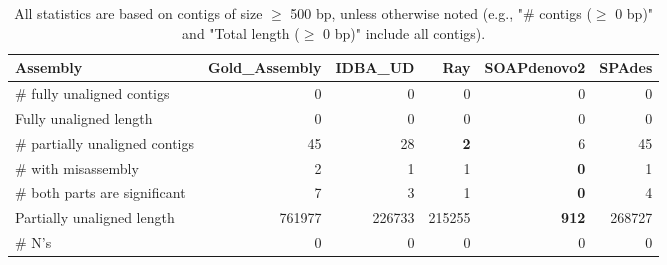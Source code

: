\documentclass[12pt,a4paper]{article}
\begin{document}
\begin{table}[ht]
\begin{center}
\caption{All statistics are based on contigs of size $\geq$ 500 bp, unless otherwise noted (e.g., "\# contigs ($\geq$ 0 bp)" and "Total length ($\geq$ 0 bp)" include all contigs).}
\begin{tabular}{|l*{5}{|r}|}
\hline
Assembly & Gold\_Assembly & IDBA\_UD & Ray & SOAPdenovo2 & SPAdes \\ \hline
\# fully unaligned contigs & 0 & 0 & 0 & 0 & 0 \\ \hline
Fully unaligned length & 0 & 0 & 0 & 0 & 0 \\ \hline
\# partially unaligned contigs & 45 & 28 & {\bf 2} & 6 & 45 \\ \hline
\hspace{5mm}\# with misassembly & 2 & 1 & 1 & {\bf 0} & 1 \\ \hline
\hspace{5mm}\# both parts are significant & 7 & 3 & 1 & {\bf 0} & 4 \\ \hline
Partially unaligned length & 761977 & 226733 & 215255 & {\bf 912} & 268727 \\ \hline
\# N's & 0 & 0 & 0 & 0 & 0 \\ \hline
\end{tabular}
\end{center}
\end{table}
\end{document}
